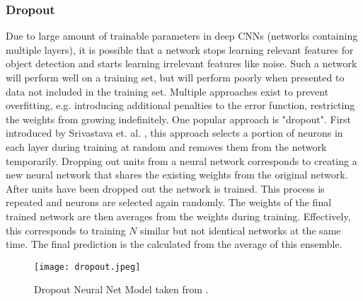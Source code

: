 \subsubsection{Dropout}
Due to large amount of trainable parameters in deep CNNs (networks containing multiple layers), it is possible that a network stops learning relevant features for object detection and starts learning irrelevant features like noise. Such a network will perform well on a training set, but will perform poorly when presented to data not included in the training set. Multiple approaches exist to prevent overfitting, e.g. introducing additional penalties to the error function, restricting the weights from growing indefinitely. One popular approach is "dropout". First introduced by Srivastava et. al. \cite{DropoutOriginal}, this approach selects a portion of neurons in each layer during training at random and removes them from the network temporarily. Dropping out units from a neural network corresponds to creating a new neural network that shares the existing weights from the original network. After units have been dropped out the network is trained. This process is repeated and neurons are selected again randomly. The weights of the final trained network are then averages from the weights during training. Effectively, this corresponds to training $N$ similar but not identical networks at the same time. The final prediction is the calculated from the average of this ensemble. \\ %

\begin{figure}[H]
	\centering
	\texttt{[image: dropout.jpeg]}
	 \caption{Dropout Neural Net Model taken from \cite{DropoutOriginal}.}
 \label{DropoutDiagram}
\end{figure}


